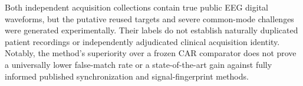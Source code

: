 Both independent acquisition collections contain true
public EEG digital waveforms, but the putative reused
targets and severe common-mode challenges were generated
experimentally. Their labels do not establish naturally
duplicated patient recordings or independently adjudicated
clinical acquisition identity. Notably, the method's
superiority over a frozen CAR comparator does not prove
a universally lower false-match rate or a
state-of-the-art gain against fully informed published
synchronization and signal-fingerprint methods.
